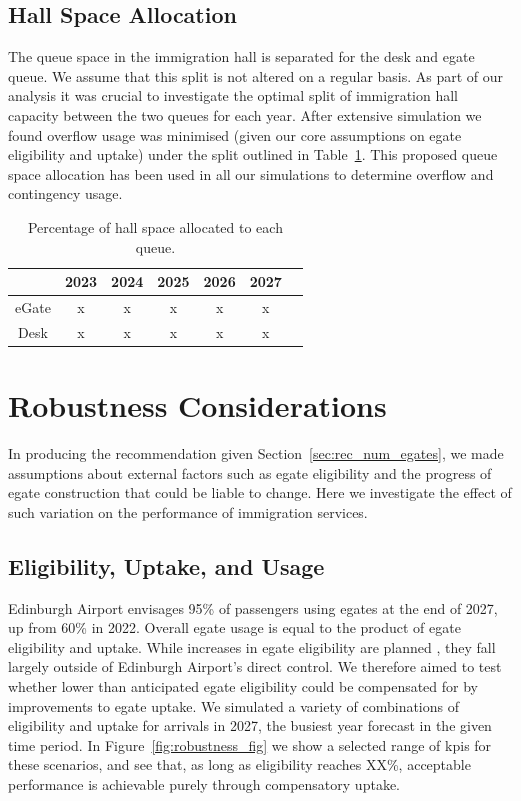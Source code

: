 \documentclass[10pt]{article}
\begin{document}
\newpage
\subsection{Hall Space Allocation}

The queue space in the immigration hall is separated for the desk and \gls{egate} queue. We assume that this split is not altered on a regular basis. As part of our analysis it was crucial to investigate the optimal split of immigration hall capacity between the two queues for each year. After extensive simulation we found overflow usage was minimised (given our core assumptions on \gls{egate} eligibility and uptake) under the split outlined in Table~\ref{tab:split}. This proposed queue space allocation has been used in all our simulations to determine overflow and contingency usage.

\begin{table}[!htp]
    \centering
    \begin{tabular}{ccccccc} \hline
        & \textbf{2023} & \textbf{2024} & \textbf{2025} & \textbf{2026} & \textbf{2027}  \\ \hline
         eGate & x & x & x & x & x \\
         Desk & x & x & x & x & x \\
          \hline
    \end{tabular}
    \caption{Percentage of hall space allocated to each queue.}
    \label{tab:split}
\end{table}


\section{Robustness Considerations} \label{sec:robustness}
In producing the recommendation given Section~\ref{sec:rec_num_egates}, we made assumptions about external factors such as \gls{egate} eligibility and the progress of \gls{egate} construction that could be liable to change. Here we investigate the effect of such variation on the performance of immigration services.

\subsection{Eligibility, Uptake, and Usage}
Edinburgh Airport envisages 95\% of passengers using \glspl{egate} at the end of 2027, up from 60\% in 2022. Overall \gls{egate} usage is equal to the product of \gls{egate} eligibility and uptake. While increases in \gls{egate} eligibility are planned \cite{UK_border_2025}, they fall largely outside of Edinburgh Airport's direct control. We therefore aimed to test whether lower than anticipated \gls{egate} eligibility could be compensated for by improvements to \gls{egate} uptake. We simulated a variety of combinations of eligibility and uptake for arrivals in 2027, the busiest year forecast in the given time period. In Figure~\ref{fig:robustness_fig} we show a selected range of \glspl{kpi} for these scenarios, and see that, as long as eligibility reaches XX\%, acceptable performance is achievable purely through compensatory uptake.
\end{document}

